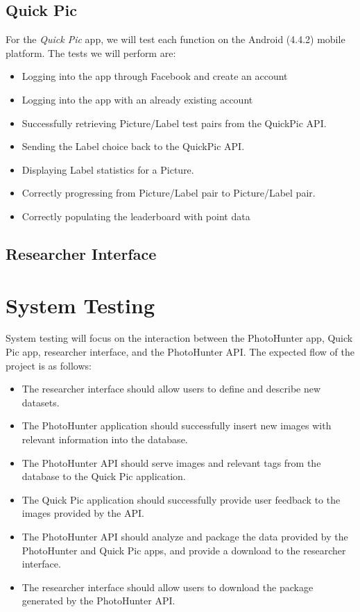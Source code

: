 \documentclass{article}
\begin{document}
\subsection{Quick Pic}
For the \textit{Quick Pic} app, we will test each function on the Android
(4.4.2) mobile platform.  The tests we will perform are:
\begin{itemize}

  \item Logging into the app through Facebook and create an account

  \item Logging into the app with an already existing account

  \item Successfully retrieving Picture/Label test pairs from the QuickPic API.

  \item Sending the Label choice back to the QuickPic API.

  \item Displaying Label statistics for a Picture.

  \item Correctly progressing from Picture/Label pair to Picture/Label pair.

  \item Correctly populating the leaderboard with point data

\end{itemize}

\subsection{Researcher Interface}


\section{System Testing}
System testing will focus on the interaction between the PhotoHunter app, Quick Pic app, researcher interface, and the PhotoHunter API.
The expected flow of the project is as follows:
\begin{itemize}
\item The researcher interface should allow users to define and describe new datasets.
\item The PhotoHunter application should successfully insert new images with relevant information into the database.
\item The PhotoHunter API should serve images and relevant tags from the database to the Quick Pic application.
\item The Quick Pic application should successfully provide user feedback to the images provided by the API.
\item The PhotoHunter API should analyze and package the data provided by the PhotoHunter and Quick Pic apps, and provide a download to the researcher interface.
\item The researcher interface should allow users to download the package generated by the PhotoHunter API.
\end{itemize}
\end{document}
